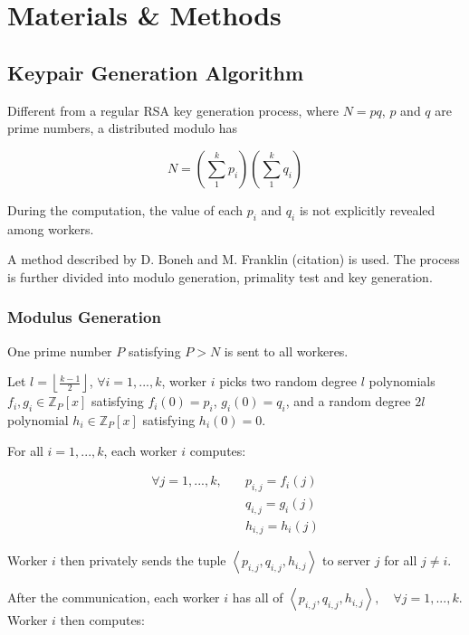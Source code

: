 \chapter{Materials \& Methods}

\section{Keypair Generation Algorithm}

Different from a regular RSA key generation process, where $N = pq$, $p$ and $q$ are prime numbers, a distributed modulo has

\begin{equation}
  N = \left( \sum_1^k p_i\right) \left( \sum_1^k q_i \right)
\end{equation}

During the computation, the value of each $p_i$ and $q_i$ is not explicitly revealed among workers.

A method described by D. Boneh and M. Franklin (citation) is used. The process is further divided into modulo generation, primality test and key generation.

\subsection{Modulus Generation}

One prime number $P$ satisfying $P > N$ is sent to all workeres.

Let $l = \left\lfloor \frac{k-1}{2} \right\rfloor $, $\forall i = 1, ..., k$, worker $i$ picks two random degree $l$ polynomials $f_i, g_i \in \mathbb{Z}_P[x]$ satisfying $f_i(0) = p_i$, $g_i(0) = q_i$, and a random degree $2l$ polynomial $h_i \in \mathbb{Z}_P[x]$ satisfying $h_i(0) = 0$.

For all $i = 1, ..., k$, each worker $i$ computes:

\begin{equation}
\begin{split}
  \forall j = 1, ..., k, \quad & p_{i, j} = f_i(j) \\
  & q_{i, j} = g_i(j) \\
  & h_{i, j} = h_i(j)
\end{split}
\end{equation}

Worker $i$ then privately sends the tuple $\left\langle p_{i,j}, q_{i,j}, h_{i,j}\right\rangle$ to server $j$ for all $j \neq i$.

After the communication, each worker $i$ has all of $\left\langle p_{i,j}, q_{i,j}, h_{i,j}\right\rangle, \quad \forall j = 1, ..., k$. Worker $i$ then computes:

